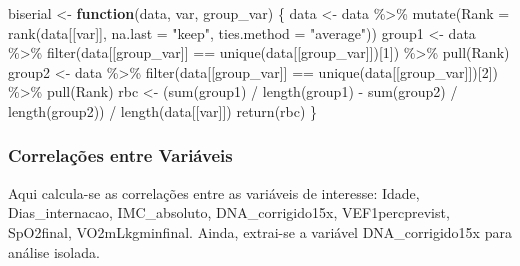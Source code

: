 \documentclass[
]{article}
\newenvironment{Shaded}{\begin{snugshade}}{\end{snugshade}}
\newcommand{\AttributeTok}[1]{\textcolor[rgb]{0.77,0.63,0.00}{#1}}
\newcommand{\ControlFlowTok}[1]{\textcolor[rgb]{0.13,0.29,0.53}{\textbf{#1}}}
\newcommand{\DecValTok}[1]{\textcolor[rgb]{0.00,0.00,0.81}{#1}}
\newcommand{\FunctionTok}[1]{\textcolor[rgb]{0.00,0.00,0.00}{#1}}
\newcommand{\NormalTok}[1]{#1}
\newcommand{\OtherTok}[1]{\textcolor[rgb]{0.56,0.35,0.01}{#1}}
\newcommand{\SpecialCharTok}[1]{\textcolor[rgb]{0.00,0.00,0.00}{#1}}
\newcommand{\StringTok}[1]{\textcolor[rgb]{0.31,0.60,0.02}{#1}}
\begin{document}
\begin{Shaded}
\begin{Highlighting}[]
\NormalTok{biserial }\OtherTok{\textless{}{-}} \ControlFlowTok{function}\NormalTok{(data, var, group\_var) \{}
\NormalTok{    data }\OtherTok{\textless{}{-}}\NormalTok{ data }\SpecialCharTok{\%\textgreater{}\%} \FunctionTok{mutate}\NormalTok{(}\AttributeTok{Rank =} \FunctionTok{rank}\NormalTok{(data[[var]], }\AttributeTok{na.last =} \StringTok{"keep"}\NormalTok{, }\AttributeTok{ties.method =} \StringTok{"average"}\NormalTok{))}
\NormalTok{    group1 }\OtherTok{\textless{}{-}}\NormalTok{ data }\SpecialCharTok{\%\textgreater{}\%}
        \FunctionTok{filter}\NormalTok{(data[[group\_var]] }\SpecialCharTok{==} \FunctionTok{unique}\NormalTok{(data[[group\_var]])[}\DecValTok{1}\NormalTok{]) }\SpecialCharTok{\%\textgreater{}\%}
        \FunctionTok{pull}\NormalTok{(Rank)}
\NormalTok{    group2 }\OtherTok{\textless{}{-}}\NormalTok{ data }\SpecialCharTok{\%\textgreater{}\%}
        \FunctionTok{filter}\NormalTok{(data[[group\_var]] }\SpecialCharTok{==} \FunctionTok{unique}\NormalTok{(data[[group\_var]])[}\DecValTok{2}\NormalTok{]) }\SpecialCharTok{\%\textgreater{}\%}
        \FunctionTok{pull}\NormalTok{(Rank)}
\NormalTok{    rbc }\OtherTok{\textless{}{-}}\NormalTok{ (}\FunctionTok{sum}\NormalTok{(group1) }\SpecialCharTok{/} \FunctionTok{length}\NormalTok{(group1) }\SpecialCharTok{{-}} \FunctionTok{sum}\NormalTok{(group2) }\SpecialCharTok{/} \FunctionTok{length}\NormalTok{(group2)) }\SpecialCharTok{/} \FunctionTok{length}\NormalTok{(data[[var]])}
    \FunctionTok{return}\NormalTok{(rbc)}
\NormalTok{\}}
\end{Highlighting}
\end{Shaded}

\hypertarget{correlauxe7uxf5es-entre-variuxe1veis}{%
\subsubsection{Correlações entre
Variáveis}\label{correlauxe7uxf5es-entre-variuxe1veis}}

Aqui calcula-se as correlações entre as variáveis de interesse: Idade,
Dias\_internacao, IMC\_absoluto, DNA\_corrigido15x, VEF1percprevist,
SpO2final, VO2mLkgminfinal. Ainda, extrai-se a variável
DNA\_corrigido15x para análise isolada.
\end{document}
